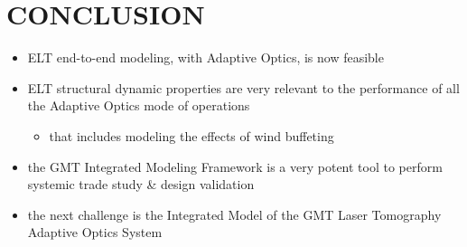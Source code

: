 \documentclass[]{AO4ELT}  %
\begin{document}
\clearpage

\section{CONCLUSION}
\label{sec:conclusion}

\begin{itemize}
   \item ELT end-to-end modeling, with Adaptive Optics, is now feasible
   \item ELT structural dynamic properties are very relevant to the performance of all the Adaptive Optics mode of operations
         \begin{itemize}
            \item that includes modeling the effects of wind buffeting
         \end{itemize}
   \item the GMT Integrated Modeling Framework is a very potent tool to perform systemic trade study \& design validation
   \item the next challenge is the Integrated Model of the GMT Laser Tomography Adaptive Optics System
\end{itemize}

\printbibliography %
\end{document}
